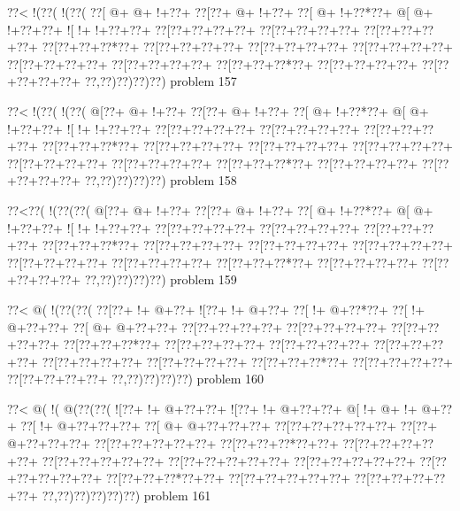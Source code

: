 \vbox{\vbox{\goo
\0??<\- !(\0??(\- !(\0??(
\0??[\- @+\- @+\- !+\0??+
\0??[\0??+\- @+\- !+\0??+
\0??[\- @+\- !+\0??*\0??+
\- @[\- @+\- !+\0??+\0??+
\- ![\- !+\- !+\0??+\0??+
\0??[\0??+\0??+\0??+\0??+
\0??[\0??+\0??+\0??+\0??+
\0??[\0??+\0??+\0??+\0??+
\0??[\0??+\0??+\0??*\0??+
\0??[\0??+\0??+\0??+\0??+
\0??[\0??+\0??+\0??+\0??+
\0??[\0??+\0??+\0??+\0??+
\0??[\0??+\0??+\0??+\0??+
\0??[\0??+\0??+\0??+\0??+
\0??[\0??+\0??+\0??*\0??+
\0??[\0??+\0??+\0??+\0??+
\0??[\0??+\0??+\0??+\0??+
\0??,\0??)\0??)\0??)\0??)
}
\hfil problem 157\hfil\break
}

\vbox{\vbox{\goo
\0??<\- !(\0??(\- !(\0??(
\- @[\0??+\- @+\- !+\0??+
\0??[\0??+\- @+\- !+\0??+
\0??[\- @+\- !+\0??*\0??+
\- @[\- @+\- !+\0??+\0??+
\- ![\- !+\- !+\0??+\0??+
\0??[\0??+\0??+\0??+\0??+
\0??[\0??+\0??+\0??+\0??+
\0??[\0??+\0??+\0??+\0??+
\0??[\0??+\0??+\0??*\0??+
\0??[\0??+\0??+\0??+\0??+
\0??[\0??+\0??+\0??+\0??+
\0??[\0??+\0??+\0??+\0??+
\0??[\0??+\0??+\0??+\0??+
\0??[\0??+\0??+\0??+\0??+
\0??[\0??+\0??+\0??*\0??+
\0??[\0??+\0??+\0??+\0??+
\0??[\0??+\0??+\0??+\0??+
\0??,\0??)\0??)\0??)\0??)
}
\hfil problem 158\hfil\break
}

\vbox{\vbox{\goo
\0??<\0??(\- !(\0??(\0??(
\- @[\0??+\- @+\- !+\0??+
\0??[\0??+\- @+\- !+\0??+
\0??[\- @+\- !+\0??*\0??+
\- @[\- @+\- !+\0??+\0??+
\- ![\- !+\- !+\0??+\0??+
\0??[\0??+\0??+\0??+\0??+
\0??[\0??+\0??+\0??+\0??+
\0??[\0??+\0??+\0??+\0??+
\0??[\0??+\0??+\0??*\0??+
\0??[\0??+\0??+\0??+\0??+
\0??[\0??+\0??+\0??+\0??+
\0??[\0??+\0??+\0??+\0??+
\0??[\0??+\0??+\0??+\0??+
\0??[\0??+\0??+\0??+\0??+
\0??[\0??+\0??+\0??*\0??+
\0??[\0??+\0??+\0??+\0??+
\0??[\0??+\0??+\0??+\0??+
\0??,\0??)\0??)\0??)\0??)
}
\hfil problem 159\hfil\break
}

\vbox{\vbox{\goo
\0??<\- @(\- !(\0??(\0??(
\0??[\0??+\- !+\- @+\0??+
\- ![\0??+\- !+\- @+\0??+
\0??[\- !+\- @+\0??*\0??+
\0??[\- !+\- @+\0??+\0??+
\0??[\- @+\- @+\0??+\0??+
\0??[\0??+\0??+\0??+\0??+
\0??[\0??+\0??+\0??+\0??+
\0??[\0??+\0??+\0??+\0??+
\0??[\0??+\0??+\0??*\0??+
\0??[\0??+\0??+\0??+\0??+
\0??[\0??+\0??+\0??+\0??+
\0??[\0??+\0??+\0??+\0??+
\0??[\0??+\0??+\0??+\0??+
\0??[\0??+\0??+\0??+\0??+
\0??[\0??+\0??+\0??*\0??+
\0??[\0??+\0??+\0??+\0??+
\0??[\0??+\0??+\0??+\0??+
\0??,\0??)\0??)\0??)\0??)
}
\hfil problem 160\hfil\break
}

\vbox{\vbox{\goo
\0??<\- @(\- !(\- @(\0??(\0??(
\- ![\0??+\- !+\- @+\0??+\0??+
\- ![\0??+\- !+\- @+\0??+\0??+
\- @[\- !+\- @+\- !+\- @+\0??+
\0??[\- !+\- @+\0??+\0??+\0??+
\0??[\- @+\- @+\0??+\0??+\0??+
\0??[\0??+\0??+\0??+\0??+\0??+
\0??[\0??+\- @+\0??+\0??+\0??+
\0??[\0??+\0??+\0??+\0??+\0??+
\0??[\0??+\0??+\0??*\0??+\0??+
\0??[\0??+\0??+\0??+\0??+\0??+
\0??[\0??+\0??+\0??+\0??+\0??+
\0??[\0??+\0??+\0??+\0??+\0??+
\0??[\0??+\0??+\0??+\0??+\0??+
\0??[\0??+\0??+\0??+\0??+\0??+
\0??[\0??+\0??+\0??*\0??+\0??+
\0??[\0??+\0??+\0??+\0??+\0??+
\0??[\0??+\0??+\0??+\0??+\0??+
\0??,\0??)\0??)\0??)\0??)\0??)
}
\hfil problem 161\hfil\break
}

